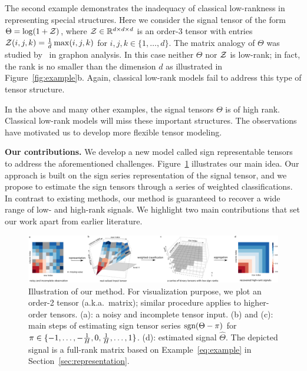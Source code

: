 \documentclass{article}
\theoremstyle{plain}
\theoremstyle{definition}
\def\sign{\textup{sgn}}
\begin{document}
The second example demonstrates the inadequacy of classical low-rankness in representing special structures. Here we consider the signal tensor of the form $\Theta=\log(1+\mathcal{Z})$, where $\mathcal{Z}\in\mathbb{R}^{d\times d\times d}$ is an order-3 tensor with entries $\mathcal{Z}(i,j,k)={1\over d}\max(i,j,k)$ for $i,j,k\in\{1,\ldots,d\}$. The matrix analogy of $\Theta$ was studied by~\cite{chan2014consistent} in graphon analysis. In this case neither $\Theta$ nor $\mathcal{Z}$ is low-rank; in fact, the rank is no smaller than the dimension $d$ as illustrated in Figure~\ref{fig:example}b. Again, classical low-rank models fail to address this type of tensor structure. 

In the above and many other examples, the signal tensors $\Theta$ is of high rank. Classical low-rank models will miss these important structures. The observations have motivated us to develop more flexible tensor modeling. 


{\bf Our contributions.} We develop a new model called sign representable tensors to address the aforementioned challenges. 
Figure~\ref{fig:demo} illustrates our main idea. Our approach is built on the sign series representation of the signal tensor, and we propose to estimate the sign tensors through a series of weighted classifications. In contrast to existing methods, our method is guaranteed to recover a wide range of low- and high-rank signals. We highlight two main contributions that set our work apart from earlier literature. 

\begin{figure}[h!]
\captionsetup{font=scriptsize}
\centerline{\includegraphics[width=1.05\textwidth]{figure/demo.pdf}}
\caption{\scriptsize Illustration of our method. For visualization purpose, we plot an order-2 tensor (a.k.a.\ matrix); similar procedure applies to higher-order tensors. (a): a noisy and incomplete tensor input. (b) and (c): main steps of estimating sign tensor series $\sign(\Theta-\pi)$ for $\pi\in  \{-1,\ldots,-{1\over H},0,{1\over H},\ldots,1\}$. (d): estimated signal $\hat \Theta$. The depicted signal is a full-rank matrix based on Example~\ref{eq:example} in Section~\ref{sec:representation}.}\label{fig:demo}
\vspace{-.4cm}
\end{figure}
\end{document}
